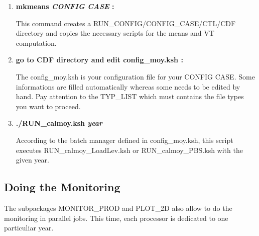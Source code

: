 \documentclass[a4paper,11pt]{article}
\begin{document}
\begin{enumerate}
\item  \textbf{mkmeans \textit{CONFIG CASE} :}

This command creates a RUN\_CONFIG/CONFIG\_CASE/CTL/CDF directory and copies the necessary
scripts for the means and VT computation.

\item \textbf{go to CDF directory and edit config\_moy.ksh :}

The config\_moy.ksh is your configuration file for your CONFIG CASE. Some informations are
filled automatically whereas some needs to be edited by hand. Pay attention to the
TYP\_LIST which must contains the file types you want to proceed.

\item \textbf{./RUN\_calmoy.ksh \textit{year}}

According to the batch manager defined in config\_moy.ksh, this script executes
RUN\_calmoy\_LoadLev.ksh or RUN\_calmoy\_PBS.ksh with the given year.

\end{enumerate}

\subsection{Doing the Monitoring}

The subpackages MONITOR\_PROD and PLOT\_2D also allow to do the monitoring in parallel jobs.
This time, each processor is dedicated to one particuliar year.
\\[0.2cm]
\par
\end{document}
